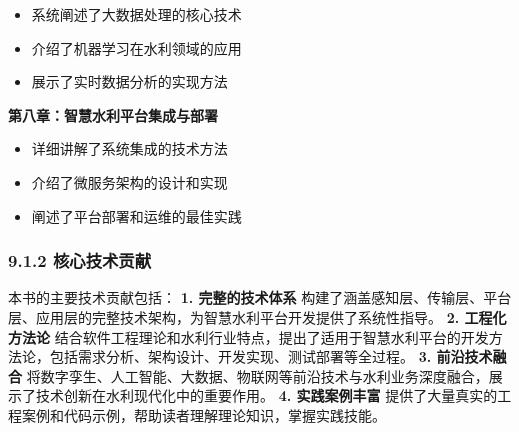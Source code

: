 \begin{itemize} \tightlist \item 系统阐述了大数据处理的核心技术 \item 介绍了机器学习在水利领域的应用 \item 展示了实时数据分析的实现方法 \end{itemize}
\textbf{第八章：智慧水利平台集成与部署} \begin{itemize} \tightlist \item 详细讲解了系统集成的技术方法 \item 介绍了微服务架构的设计和实现 \item 阐述了平台部署和运维的最佳实践
\end{itemize} \subsubsection{9.1.2 核心技术贡献}\label{ux6838ux5fc3ux6280ux672fux8d21ux732e} 本书的主要技术贡献包括： \textbf{1. 完整的技术体系}
构建了涵盖感知层、传输层、平台层、应用层的完整技术架构，为智慧水利平台开发提供了系统性指导。 \textbf{2. 工程化方法论}
结合软件工程理论和水利行业特点，提出了适用于智慧水利平台的开发方法论，包括需求分析、架构设计、开发实现、测试部署等全过程。 \textbf{3. 前沿技术融合}
将数字孪生、人工智能、大数据、物联网等前沿技术与水利业务深度融合，展示了技术创新在水利现代化中的重要作用。 \textbf{4. 实践案例丰富} 提供了大量真实的工程案例和代码示例，帮助读者理解理论知识，掌握实践技能。
